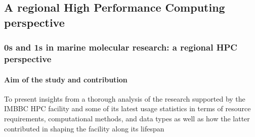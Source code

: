 \documentclass{beamer}
\begin{document}
   \begin{darkframes}
      \section{
         A regional High Performance Computing perspective
         }

      \begin{frame}
         \frametitle{0s and 1s in marine molecular research: a regional HPC perspective}
         \framesubtitle{Aim of the study and contribution}

         To present insights from a thorough analysis of the research supported by
         the IMBBC HPC facility and some of its latest usage statistics in terms of resource requirements, 
         computational methods, and data types as well as how the latter contributed in shaping the facility
         along its lifespan
         
      \end{frame}
   \end{darkframes}
\end{document}
